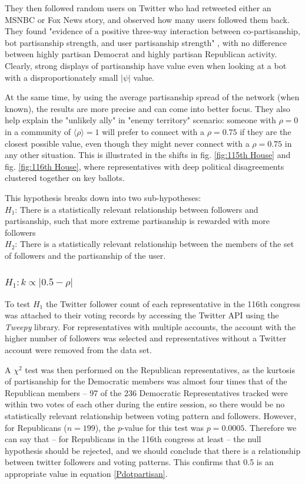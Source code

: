 \documentclass[preprint,review,12pt]{elsarticle}
\begin{document}
They then followed random users on Twitter who had retweeted either an MSNBC or Fox News story, and observed how many users followed them back. They found "evidence of a positive three-way interaction between co-partisanship, bot partisanship strength, and user partisanship strength" \cite{mosleh2020shared}, with no difference between highly partisan Democrat and highly partisan Republican activity. Clearly, strong displays of partisanship have value even when looking at a bot with a disproportionately small $|\psi|$ value.

At the same time, by using the average partisanship spread of the network (when known), the results are more precise and can come into better focus. They also help explain the "unlikely ally" in "enemy territory" scenario: someone with $\rho = 0$ in a community of $\langle \rho \rangle=1$ will prefer to connect with a $\rho = 0.75$ if they are the closest possible value, even though they might never connect with a $\rho = 0.75$ in any other situation. This is illustrated in the shifts in fig. \ref{fig:115th House} and fig. \ref{fig:116th House}, where representatives with deep political disagreements clustered together on key ballots.

This hypothesis breaks down into two sub-hypotheses: \\
\textbf{$H_1$}: There is a statistically relevant relationship between followers and partisanship, such that more extreme partisanship is rewarded with more followers \\
\textbf{$H_2$}: There is a statistically relevant relationship between the members of the set of followers and the partisanship of the user.

 \subsubsection{$H_1: k \propto |0.5 - \rho|$}
  \label{$H_1: k \propto |0.5 - \rho|$}
 To test $H_1$ the Twitter follower count of each representative in the 116th congress was attached to their voting records by accessing the Twitter API using the \textit{Tweepy} library. For representatives with multiple accounts, the account with the higher number of followers was selected and representatives without a Twitter account were removed from the data set. 

A $\chi^2$ test was then performed on the Republican representatives, as the kurtosis of partisanship for the Democratic members was almost four times that of the Republican members -- 97 of the 236 Democratic Representatives tracked were within two votes of each other during the entire session, so there would be no statistically relevant relationship between voting pattern and followers. However, for Republicans ($n = 199$), the $p$-value for this test was $p=0.0005$. Therefore we can say that -- for Republicans in the 116th congress at least -- the null hypothesis should be rejected, and we should conclude that there is a relationship between twitter followers and voting patterns. This confirms that 0.5 is an appropriate value in equation \ref{Pdotpartisan}.
\end{document}
